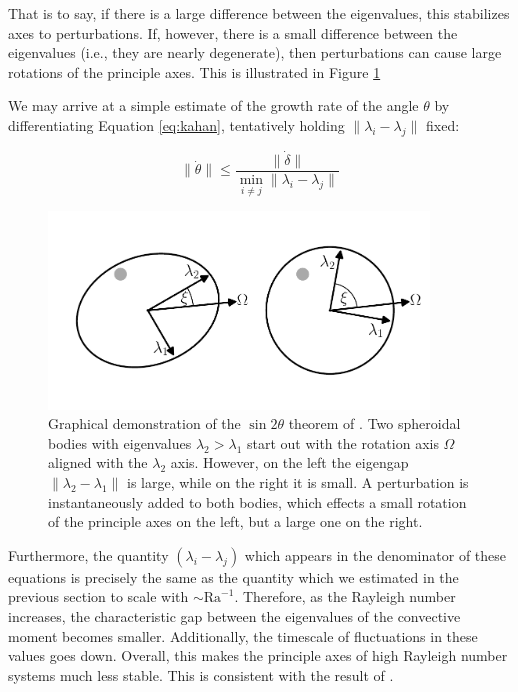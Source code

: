 \documentclass[extra,mreferee]{gji}
\begin{document}
That is to say, if there is a large difference between the eigenvalues, this stabilizes axes to perturbations.  
If, however, there is a small difference between the eigenvalues (i.e., they are nearly degenerate), then perturbations can cause large rotations of the principle axes.
This is illustrated in Figure \ref{fig:perturb}


We may arrive at a simple estimate of the growth rate of the angle $\theta$ by differentiating Equation \ref{eq:kahan}, tentatively holding $\lVert \lambda_i - \lambda_j \rVert$ fixed:

\begin{equation}
\lVert \dot{\theta} \rVert \le \frac{ \lVert \dot{\delta} \rVert}{ \displaystyle \min_{i \neq j} \lVert \lambda_i - \lambda_j \rVert }
\label{eq:grow_perturbation}
\end{equation} 

\begin{figure}
\centering
\label{fig:perturb}
\includegraphics[width=0.9\textwidth]{figures/perturb.pdf}
\caption{Graphical demonstration of the $\sin{2 \theta}$ theorem of \citet{davis1970rotation}.  Two spheroidal bodies with eigenvalues $\lambda_2 > \lambda_1$ start out with the rotation axis $\Omega$ aligned with the $\lambda_2$ axis. However, on the left the eigengap $\lVert \lambda_2 - \lambda_1 \rVert$ is large, while on the right it is small.  A perturbation is instantaneously added to both bodies, which effects a small rotation of the principle axes on the left, but a large one on the right.}
\end{figure}


Furthermore, the quantity $(\lambda_i-\lambda_j)$ which appears in the denominator of these equations is precisely the same as the quantity which we estimated in the previous section to scale with $\sim \mathrm{Ra}^{-1}$.
Therefore, as the Rayleigh number increases, the characteristic gap between the eigenvalues of the convective moment becomes smaller.  
Additionally, the timescale of fluctuations in these values goes down. 
Overall, this makes the principle axes of high Rayleigh number systems much less stable.
This is consistent with the result of \citet{richards1999polar}.
\end{document}
